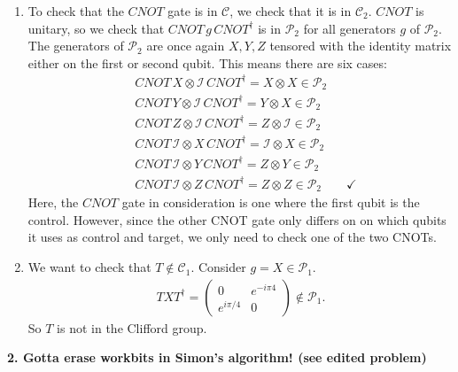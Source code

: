 \documentclass{article}
\theoremstyle{definition}
\newcommand{\Id}{\mathcal{I}}
\begin{document}
\begin{enumerate}[label=(\alph*)]
	\item To check that the $CNOT$ gate is in $\mathcal{C}$, we check that it is in $\mathcal{C}_2$. $CNOT$ is unitary, so we check that $CNOT \, g \, CNOT^\dagger$ is in $\mathcal{P}_2$ for all generators $g$ of $\mathcal{P}_2$. The generators of $\mathcal{P}_2$ are once again $X,Y,Z$ tensored with the identity matrix either on the first or second qubit. This means there are six cases:
	 \begin{align*}
	 	&CNOT\,X \otimes \Id \,CNOT^\dagger = X\otimes X \in \mathcal{P}_2 \\
	 	&CNOT\,Y \otimes \Id \,CNOT^\dagger = Y\otimes X \in \mathcal{P}_2 \\
	 	&CNOT\,Z \otimes \Id \,CNOT^\dagger = Z\otimes \Id \in \mathcal{P}_2 \\
	 	&CNOT\,\Id \otimes X \,CNOT^\dagger = \Id \otimes X \in \mathcal{P}_2 \\
	 	&CNOT\,\Id \otimes Y \,CNOT^\dagger = Z \otimes Y \in \mathcal{P}_2 \\
	 	&CNOT\,\Id \otimes Z \,CNOT^\dagger = Z \otimes Z \in \mathcal{P}_2 \quad\quad \checkmark
	 \end{align*}
 	Here, the $CNOT$ gate in consideration is one where the first qubit is the control. However, since the other CNOT gate only differs on on which qubits it uses as control and target, we only need to check one of the two CNOTs.
	
	\item We want to check that $T\notin \mathcal{C}_1$. Consider $g = X\in \mathcal{P}_1$. 
	\begin{align*}
		TXT^\dagger = \begin{pmatrix}
			0 & e^{-i\pi4} \\ e^{i\pi/4} & 0
		\end{pmatrix} \notin \mathcal{P}_1.
	\end{align*}
	So $T$ is not in the Clifford group.
\end{enumerate}



\noindent \textbf{2. Gotta erase workbits in Simon's algorithm! (see edited problem)}\\
\end{document}
